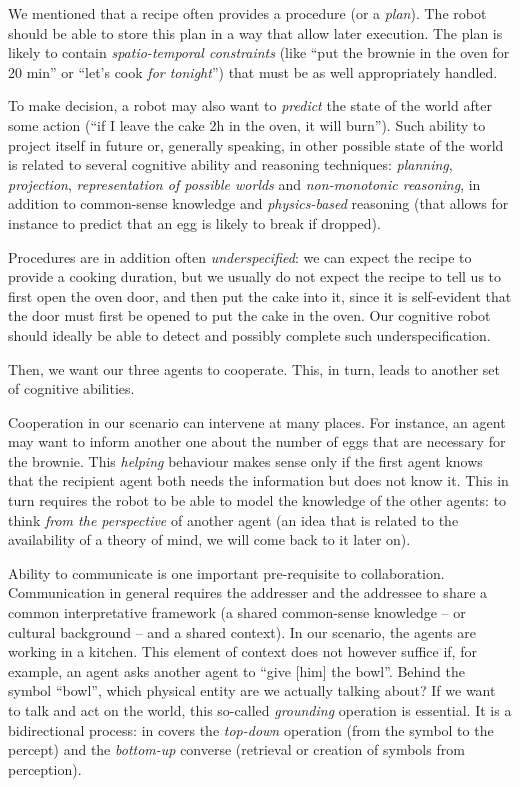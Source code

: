 We mentioned that a recipe often provides a procedure (or a \emph{plan}). The
robot should be able to store this plan in a way that allow later execution.
The plan is likely to contain \emph{spatio-temporal constraints} (like ``put
the brownie in the oven for 20 min'' or ``let's cook \emph{for tonight}'') that
must be as well appropriately handled.

To make decision, a robot may also want to \emph{predict} the state of the
world after some action (``if I leave the cake 2h in the oven, it will burn'').
Such ability to project itself in future or, generally speaking, in other
possible state of the world is related to several cognitive ability and
reasoning techniques: \emph{planning}, \emph{projection}, \emph{representation
of possible worlds} and \emph{non-monotonic reasoning}, in addition to
common-sense knowledge and \emph{physics-based} reasoning (that allows for
instance to predict that an egg is likely to break if dropped).

Procedures are in addition often \emph{underspecified}: we can expect the
recipe to provide a cooking duration, but we usually do not expect the recipe
to tell us to first open the oven door, and then put the cake into it, since it
is self-evident that the door must first be opened to put the cake in the oven.
Our cognitive robot should ideally be able to detect and possibly complete such
underspecification.

Then, we want our three agents to cooperate. This, in turn, leads to another
set of cognitive abilities.

Cooperation in our scenario can intervene at many places. For instance, an
agent may want to inform another one about the number of eggs that are
necessary for the brownie. This \emph{helping} behaviour makes sense only if
the first agent knows that the recipient agent both needs the information but
does not know it. This in turn requires the robot to be able to model the
knowledge of the other agents: to think \emph{from the perspective} of another
agent (an idea that is related to the availability of a theory of mind, we will
come back to it later on).

Ability to communicate is one important pre-requisite to collaboration.
Communication in general requires the addresser and the addressee to share a
common interpretative framework (a shared common-sense knowledge -- or cultural
background -- and a shared context). In our scenario, the agents are working in
a kitchen. This element of context does not however suffice if, for example, an
agent asks another agent to ``give {[him]} the bowl''. Behind the symbol
``bowl'', which physical entity are we actually talking about? If we want to
talk and act on the world, this so-called \emph{grounding} operation is
essential. It is a bidirectional process: in covers the {\it top-down}
operation (from the symbol to the percept) and the {\it bottom-up} converse
(retrieval or creation of symbols from perception).


